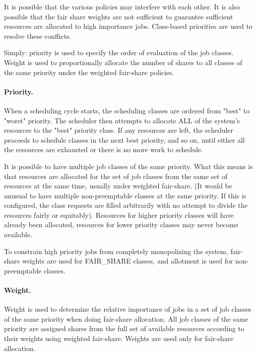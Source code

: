     It is possible that the various policies may interfere with each other. It is also possible that
    the fair share weights are not sufficient to guarantee sufficient resources are allocated to
    high importance jobs. Class-based priorities are used to resolve these conflicts.

    Simply: priority is used to specify the order of evaluation of the
    job classes. Weight is used to proportionally allocate the number
    of shares to all classes of the same priority under the weighted
    fair-share policies.

    \paragraph{Priority.} 
    
    When a scheduling cycle starts, the scheduling classes are ordered from "best" to "worst" priority. 
    The scheduler then attempts to allocate ALL of the system's resources to the "best" priority class. 
    If any resources are left, the scheduler proceeds to schedule classes in the next best
    priority, and so on, until either all the 
    resources are exhausted or there is no more work to schedule. 
    
    It is possible to have multiple job classes of the same priority. What this means is that resources 
    are allocated for the set of job classes from the same set of resources at the same time, usually
    under weighted fair-share. (It would be unusual to have multiple non-preemptable classes at the
    same priority.  If this is configured, the class requests are filled arbitrarily with no attempt
    to divide the resources fairly or equitably). Resources for higher priority 
    classes will have already been allocated, resources for lower priority classes may never become 
    available. 
    
    To constrain high priority jobs from completely monopolizing the
    system, fair-share weights are used for FAIR\_SHARE classes, and 
    allotment is used for non-preemptable classes. 

    \paragraph{Weight.} Weight is used to determine the relative importance of jobs in a set of job classes of 
    the same priority when doing fair-share allocation. All job classes of the same priority are assigned 
    shares from the full set of available resources according to their weights using weighted fair-share. 
    Weights are used only for fair-share allocation. 
    
